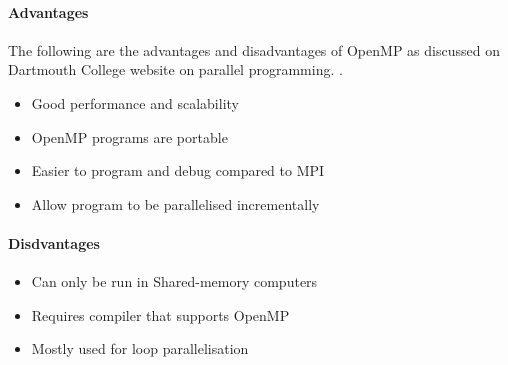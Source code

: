 \paragraph{Advantages}
The following are the advantages and disadvantages of OpenMP as discussed on Dartmouth  College website on parallel programming. \citep{Dartmouth:mpi}.
\begin{itemize}
	\item Good performance and scalability
	\item OpenMP programs are portable
	\item Easier to program and debug compared to MPI
	\item Allow program to be parallelised incrementally
\end{itemize}

\paragraph{Disdvantages}

\begin{itemize}
	\item Can only be run in Shared-memory computers
	\item Requires compiler that supports OpenMP
	\item Mostly used for loop parallelisation
\end{itemize}


